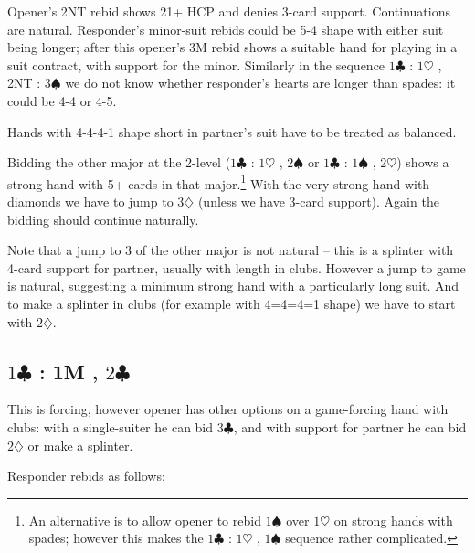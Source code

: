 \documentclass{article}
\newcommand{\sz}{\spadesuit}
\newcommand{\hz}{\heartsuit}
\newcommand{\dz}{\diamondsuit}
\newcommand{\cz}{\clubsuit}
\begin{document}
\begin{description}
Opener's 2NT rebid shows 21+ HCP and denies 3-card support. Continuations are natural. Responder's minor-suit rebids could be 5-4 shape with either suit being longer; after this opener's 3M rebid shows a suitable hand for playing in a suit contract, with support for the minor. Similarly in the sequence $1\cz$ : $1\hz$ , 2NT : $3\sz$ we do not know whether responder's hearts are longer than spades: it could be 4-4 or 4-5.

Hands with 4-4-4-1 shape short in partner's suit have to be treated as balanced.

Bidding the other major at the 2-level ($1\cz$ : $1\hz$ , $2\sz$ or $1\cz$ : $1\sz$ , $2\hz$) shows a strong hand with 5+ cards in that major.\footnote{An alternative is to allow opener to rebid $1\sz$ over $1\hz$ on strong hands with spades; however this makes the $1\cz$ : $1\hz$ , $1\sz$ sequence rather complicated.} With the very strong hand with diamonds we have to jump to $3\dz$ (unless we have 3-card support). Again the bidding should continue naturally.

Note that a jump to 3 of the other major is not natural -- this is a splinter with 4-card support for partner, usually with length in clubs. However a jump to game is natural, suggesting a minimum strong hand with a particularly long suit. And to make a splinter in clubs (for example with 4=4=4=1 shape) we have to start with $2\dz$.
\end{description}

\subsection{$1\cz$ : 1M , $2\cz$}

This is forcing, however opener has other options on a game-forcing hand with clubs: with a single-suiter he can bid $3\cz$, and with support for partner he can bid $2\dz$ or make a splinter.

Responder rebids as follows:
\end{document}

